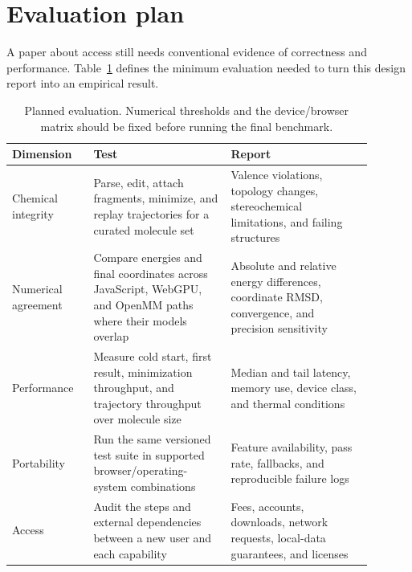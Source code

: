 \documentclass[11pt]{article}
\begin{document}
\section{Evaluation plan}
\label{sec:evaluation}

A paper about access still needs conventional evidence of correctness and
performance.
Table~\ref{tab:evaluation} defines the minimum evaluation needed to turn this
design report into an empirical result.

\begin{table}[htbp]
  \centering
  \caption{Planned evaluation. Numerical thresholds and the device/browser matrix
    should be fixed before running the final benchmark.}
  \label{tab:evaluation}
  \footnotesize
  \renewcommand{\arraystretch}{1.05}
  \begin{tabular}{@{}>{\raggedright\arraybackslash}p{0.20\linewidth}
                       >{\raggedright\arraybackslash}p{0.34\linewidth}
                       >{\raggedright\arraybackslash}p{0.35\linewidth}@{}}
    \toprule
    Dimension & Test & Report \\
    \midrule
    Chemical integrity &
      Parse, edit, attach fragments, minimize, and replay trajectories for a
      curated molecule set &
      Valence violations, topology changes, stereochemical limitations, and
      failing structures \\
    Numerical agreement &
      Compare energies and final coordinates across JavaScript, WebGPU, and
      OpenMM paths where their models overlap &
      Absolute and relative energy differences, coordinate RMSD, convergence,
      and precision sensitivity \\
    Performance &
      Measure cold start, first result, minimization throughput, and trajectory
      throughput over molecule size &
      Median and tail latency, memory use, device class, and thermal conditions \\
    Portability &
      Run the same versioned test suite in supported browser/operating-system
      combinations &
      Feature availability, pass rate, fallbacks, and reproducible failure logs \\
    Access &
      Audit the steps and external dependencies between a new user and each
      capability &
      Fees, accounts, downloads, network requests, local-data guarantees, and
      licenses \\
    \bottomrule
  \end{tabular}
\end{table}
\end{document}
